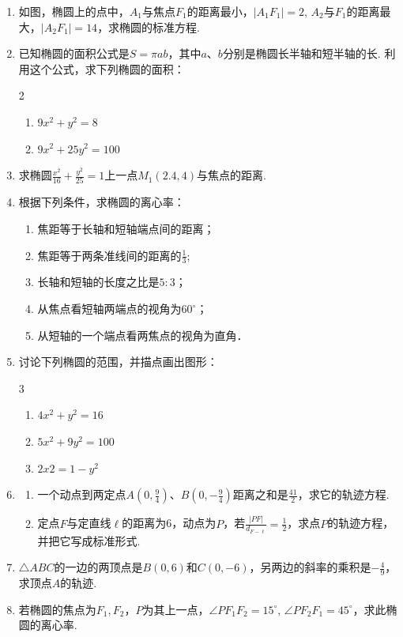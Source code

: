 \begin{enumerate}
\item 如图，椭圆上的点中，$A_1$与焦点$F_1$的距离最小，$|A_1F_1|=2$, $A_2$与$F_1$的距离最大，$|A_2F_1|=14$，求椭圆的标准方程.
\item 已知椭圆的面积公式是$S=\pi ab$，其中$a$、$b$分别是椭圆长半轴和短半轴的长. 利用这个公式，求下列椭圆的面积：
\begin{multicols}{2}
\begin{enumerate}[(1)]
    \item $9x^2+y^2=8$
    \item $9x^2+25y^2=100$
\end{enumerate}
\end{multicols}

\item 求椭圆$\frac{x^2}{16}+\frac{y^2}{25}=1$上一点$M_1(2.4,4)$与焦点的距离.
\item 根据下列条件，求椭圆的离心率：
\begin{enumerate}[(1)]
    \item 焦距等于长轴和短轴端点间的距离；
    \item 焦距等于两条准线间的距离的$\frac{1}{3}$;
    \item 长轴和短轴的长度之比是$5:3$；
    \item 从焦点看短轴两端点的视角为$60^{\circ}$；
    \item 从短轴的一个端点看两焦点的视角为直角．
\end{enumerate}

\item 讨论下列椭圆的范围，并描点画出图形：
\begin{multicols}{3}
\begin{enumerate}[(1)]
    \item $4x^2+y^2=16$
    \item $5x^2+9y^2=100$
    \item $2x2=1-y^2$
\end{enumerate}
\end{multicols}

\item \begin{enumerate}[(1)]
    \item 一个动点到两定点$A\left(0,\frac{9}{4}\right)$、$B\left(0,-\frac{9}{4}\right)$距离之和是$\frac{41}{2}$，求它的轨迹方程.
    \item 定点$F$与定直线$\ell$的距离为6，动点为$P$，若$\frac{|PF|}{d_{F-\ell}}=\frac{1}{2}$，求点$P$的轨迹方程，并把它写成标准形式.
\end{enumerate}
\item $\triangle ABC$的一边的两顶点是$B(0,6)$和$C(0,-6)$，另两边的斜率的乘积是$-\frac{4}{9}$，
求顶点$A$的轨迹.

\item 若椭圆的焦点为$F_1,F_2$，$P$为其上一点，$\angle PF_1F_2=15^{\circ}$, $\angle PF_2F_1=45^{\circ}$，求此椭圆的离心率.
\end{enumerate}

